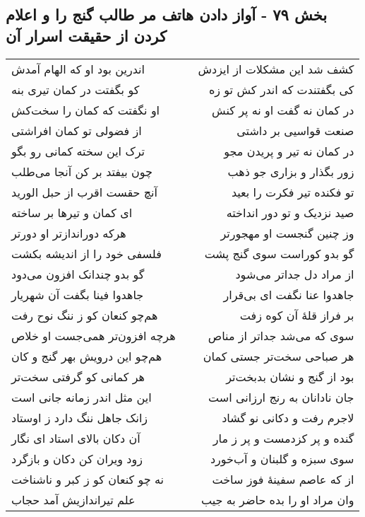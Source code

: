 \begin{center}
\section*{بخش ۷۹ - آواز دادن هاتف مر طالب گنج را و اعلام کردن از حقیقت اسرار آن}
\label{sec:sh079}
\begin{longtable}{l p{0.5cm} r}
اندرین بود او که الهام آمدش
&&
کشف شد این مشکلات از ایزدش
\\
کو بگفتت در کمان تیری بنه
&&
کی بگفتندت که اندر کش تو زه
\\
او نگفتت که کمان را سخت‌کش
&&
در کمان نه گفت او نه پر کنش
\\
از فضولی تو کمان افراشتی
&&
صنعت قواسیی بر داشتی
\\
ترک این سخته کمانی رو بگو
&&
در کمان نه تیر و پریدن مجو
\\
چون بیفتد بر کن آنجا می‌طلب
&&
زور بگذار و بزاری جو ذهب
\\
آنچ حقست اقرب از حبل الورید
&&
تو فکنده تیر فکرت را بعید
\\
ای کمان و تیرها بر ساخته
&&
صید نزدیک و تو دور انداخته
\\
هرکه دوراندازتر او دورتر
&&
وز چنین گنجست او مهجورتر
\\
فلسفی خود را از اندیشه بکشت
&&
گو بدو کوراست سوی گنج پشت
\\
گو بدو چندانک افزون می‌دود
&&
از مراد دل جداتر می‌شود
\\
جاهدوا فینا بگفت آن شهریار
&&
جاهدوا عنا نگفت ای بی‌قرار
\\
هم‌چو کنعان کو ز ننگ نوح رفت
&&
بر فراز قلهٔ آن کوه زفت
\\
هرچه افزون‌تر همی‌جست او خلاص
&&
سوی که می‌شد جداتر از مناص
\\
هم‌چو این درویش بهر گنج و کان
&&
هر صباحی سخت‌تر جستی کمان
\\
هر کمانی کو گرفتی سخت‌تر
&&
بود از گنج و نشان بدبخت‌تر
\\
این مثل اندر زمانه جانی است
&&
جان نادانان به رنج ارزانی است
\\
زانک جاهل ننگ دارد ز اوستاد
&&
لاجرم رفت و دکانی نو گشاد
\\
آن دکان بالای استاد ای نگار
&&
گنده و پر کزدمست و پر ز مار
\\
زود ویران کن دکان و بازگرد
&&
سوی سبزه و گلبنان و آب‌خورد
\\
نه چو کنعان کو ز کبر و ناشناخت
&&
از که عاصم سفینهٔ فوز ساخت
\\
علم تیراندازیش آمد حجاب
&&
وان مراد او را بده حاضر به جیب
\\

\end{longtable}
\end{center}
